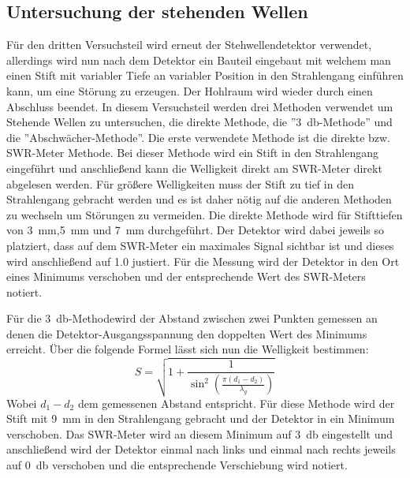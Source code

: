     \subsection{Untersuchung der stehenden Wellen}
        Für den dritten Versuchsteil wird erneut der Stehwellendetektor verwendet, allerdings wird nun nach dem Detektor ein Bauteil eingebaut mit welchem man einen Stift mit variabler Tiefe an variabler Position in den Strahlengang einführen kann, um eine Störung zu erzeugen.
        Der Hohlraum wird wieder durch einen Abschluss beendet.
        In diesem Versuchsteil werden drei Methoden verwendet um Stehende Wellen zu untersuchen, die direkte Methode, die ”\SI{3}{\decibel}-Methode” und die ”Abschwächer-Methode”.
        Die erste verwendete Methode ist die direkte bzw. SWR-Meter Methode.
        Bei dieser Methode wird ein Stift in den Strahlengang eingeführt und anschließend kann die Welligkeit direkt am SWR-Meter direkt abgelesen werden. Für größere Welligkeiten muss der Stift zu tief in den Strahlengang gebracht werden und es ist daher nötig auf die anderen Methoden zu wechseln um Störungen zu vermeiden.
        Die direkte Methode wird für Stifttiefen von \SI{3}{\milli\metre},\SI{5}{\milli\metre} und \SI{7}{\milli\metre} durchgeführt. Der Detektor wird dabei jeweils so platziert, dass auf dem SWR-Meter ein maximales Signal sichtbar ist und dieses wird anschließend auf \num{1.0} justiert. Für die Messung wird der Detektor in den Ort eines Minimums verschoben und der entsprechende Wert des SWR-Meters notiert.

        Für die \glqq \SI{3}{\decibel}-Methode\glqq  wird der Abstand zwischen zwei Punkten gemessen an denen die Detektor-Ausgangsspannung den doppelten Wert des Minimums erreicht. Über die folgende Formel lässt sich nun die Welligkeit bestimmen:
        \begin{equation}
            \label{eqn:SWR}
            S = \sqrt{1+\frac{1}{\sin^2\left(\frac{\pi \left(d_1 - d_2\right)}{\lambda_g}\right)}}
        \end{equation}
        Wobei $d_1 - d_2$ dem gemessenen Abstand entspricht.
        Für diese Methode wird der Stift mit \SI{9}{\milli\metre} in den Strahlengang gebracht und der Detektor in ein Minimum verschoben.
        Das SWR-Meter wird an diesem Minimum auf \SI{3}{\decibel} eingestellt und anschließend wird der Detektor einmal nach links und einmal nach rechts jeweils auf \SI{0}{\decibel} verschoben und die entsprechende Verschiebung wird notiert.


